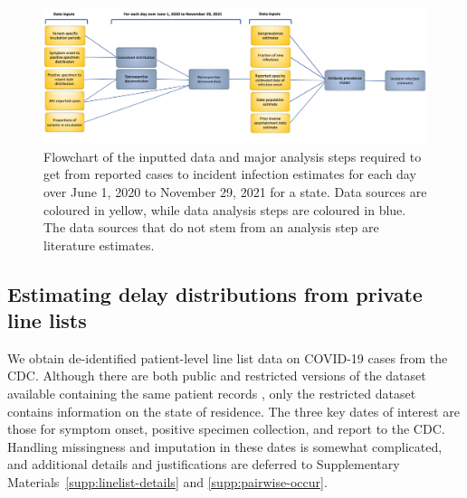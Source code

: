 \documentclass{article}
\begin{document}
\begin{figure}[!tb]
\centering
    \includegraphics[width=.99\textwidth]{Reported_cases_to_infect_flowchart.pdf} 
    \caption{Flowchart of the inputted data and major analysis steps required 
    to get from reported cases to incident infection estimates for each day 
    over June 1, 2020 to November 29, 2021 for a state. Data sources are coloured 
    in yellow, while data analysis steps are coloured in blue. The data sources that
    do not stem from an analysis step are literature estimates.}
    \label{fig:cases_to_infect_flowchart}
\end{figure}









\subsection{Estimating delay distributions from private line lists}
\label{sec:delaystop}

We obtain de-identified patient-level line list data on COVID-19 cases from the
CDC. Although there are both public and restricted versions of the dataset
available containing the same patient records \citep{cdc2020casepub,
cdc2020caserestr}, only the restricted dataset contains information on the state
of residence. The three key dates of interest are those for symptom onset,
positive specimen collection, and report to the CDC. Handling missingness and
imputation in these dates is somewhat complicated, and additional details and
justifications are deferred to Supplementary Materials~\ref{supp:linelist-details} and \ref{supp:pairwise-occur}.
\end{document}
